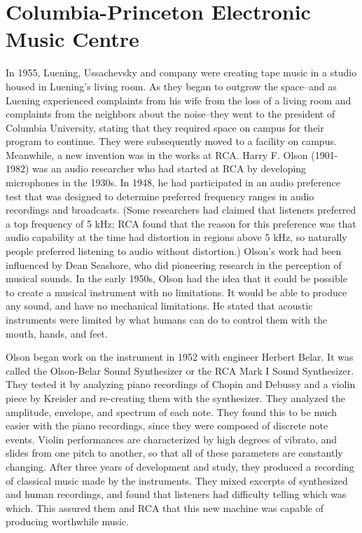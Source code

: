 
\section{Columbia-Princeton Electronic Music Centre}
In 1955, Luening, Ussachevsky and company were creating tape music in a studio housed in Luening's living room. As they began to outgrow the space--and as Luening experienced complaints from his wife from the loss of a living room and complaints from the neighbors about the noise--they went to the president of Columbia University, stating that they required space on campus for their program to continue. They were subsequently moved to a facility on campus. Meanwhile, a new invention was in the works at RCA. Harry F. Olson (1901-1982) was an audio researcher who had started at RCA by developing microphones in the 1930s. In 1948, he had participated in an audio preference test that was designed to determine preferred frequency ranges in audio recordings and broadcasts. (Some researchers had claimed that listeners preferred a top frequency of 5 kHz; RCA found that the reason for this preference was that audio capability at the time had distortion in regions above 5 kHz, so naturally people preferred listening to audio without distortion.) Olson's work had been influenced by Dean Seashore, who did pioneering research in the perception of musical sounds. In the early 1950s, Olson had the idea that it could be possible to create a musical instrument with no limitations. It would be able to produce any sound, and have no mechanical limitations. He stated that acoustic instruments were limited by what humans can do to control them with the mouth, hands, and feet.

Olson began work on the instrument in 1952 with engineer Herbert Belar. It was called the Olson-Belar Sound Synthesizer or the RCA Mark I Sound Synthesizer. They tested it by analyzing piano recordings of Chopin and Debussy and a violin piece by Kreisler and re-creating them with the synthesizer. They analyzed the amplitude, envelope, and spectrum of each note. They found this to be much easier with the piano recordings, since they were composed of discrete note events. Violin performances are characterized by high degrees of vibrato, and slides from one pitch to another, so that all of these parameters are constantly changing. After three years of development and study, they produced a recording of classical music made by the instruments. They mixed excerpts of synthesized and human recordings, and found that listeners had difficulty telling which was which. This assured them and RCA that this new machine was capable of producing worthwhile music.

